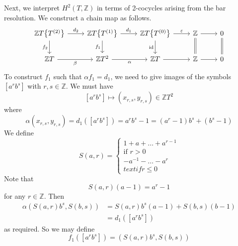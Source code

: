 \begin{example}
    Next, we interpret \( H^2(T, \mathbb Z) \) in terms of 2-cocycles arising from the bar resolution.
    We construct a chain map as follows.
\[\begin{tikzcd}[ampersand replacement=\&]
	{\mathbb ZT\qty{T^{(2)}}} \& {\mathbb ZT\qty{T^{(1)}}} \& {\mathbb ZT\qty{T^{(0)}}} \& {\mathbb Z} \& 0 \\
	{\mathbb Z T} \& {\mathbb Z T^2} \& {\mathbb Z T} \& {\mathbb Z} \& 0
	\arrow["{d_2}", from=1-1, to=1-2]
	\arrow["{d_1}", from=1-2, to=1-3]
	\arrow["\varepsilon", from=1-3, to=1-4]
	\arrow[from=1-4, to=1-5]
	\arrow["\beta"', from=2-1, to=2-2]
	\arrow["\alpha"', from=2-2, to=2-3]
	\arrow[from=2-3, to=2-4]
	\arrow[from=2-4, to=2-5]
	\arrow[Rightarrow, no head, from=1-4, to=2-4]
	\arrow["{f_2}"', from=1-1, to=2-1]
	\arrow["{f_1}"', from=1-2, to=2-2]
	\arrow["\id"', from=1-3, to=2-3]
	\arrow[Rightarrow, no head, from=2-5, to=1-5]
\end{tikzcd}\]
    To construct \( f_1 \) such that \( \alpha f_1 = d_1 \), we need to give images of the symbols \( [a^r b^s] \) with \( r, s \in \mathbb Z \).
    We must have
    \[ [a^r b^s] \mapsto (x_{r,s}, y_{r,s}) \in \mathbb ZT^2 \]
    where
    \[ \alpha(x_{r,s}, y_{r,s}) = d_1([a^r b^s]) = a^r b^s - 1 = (a^r - 1)b^s + (b^s - 1) \]
    We define
    \[ S(a, r) = \begin{cases}
        1 + a + \dots + a^{r-1} \\ \text{if } r > 0 \\
        -a^{-1} - \dots - a^r \\ text{if } r \leq 0
    \end{cases} \]
    Note that
    \[ S(a, r)(a-1) = a^r - 1 \]
    for any \( r \in \mathbb Z \).
    Then
    \begin{align*}
        \alpha(S(a, r) b^s, S(b, s)) &= S(a, r) b^s(a-1) + S(b, s)(b-1) \\
        &= d_1([a^r b^s])
    \end{align*}
    as required.
    So we may define
    \[ f_1([a^r b^s]) = (S(a, r) b^s, S(b, s)) \]
\end{example}
